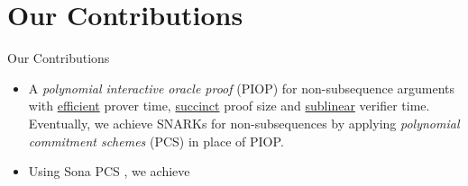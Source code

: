 \section{Our Contributions}
\begin{frame}{Our Contributions}
	\begin{itemize}
		\item A \textit{polynomial interactive oracle proof} (PIOP) for non-subsequence arguments with \underline{efficient} prover time, \underline{succinct} proof size and \underline{sublinear} verifier time. Eventually, we achieve SNARKs for non-subsequences by applying \textit{polynomial commitment schemes} (PCS) in place of PIOP.
		
		\item Using Sona PCS \cite{EC:SetThaWah23b}, we achieve 
	\end{itemize}
\end{frame}
